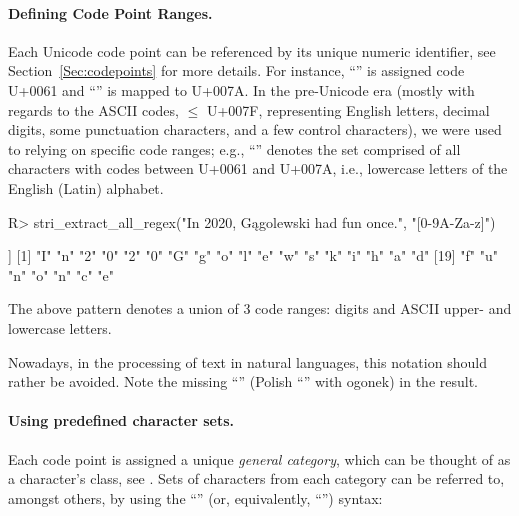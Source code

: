 \documentclass[nojss]{jss}
\begin{document}
\paragraph{Defining Code Point Ranges.}
Each Unicode code point can be referenced by its unique numeric identifier,
see Section~\ref{Sec:codepoints}  for more details.
For instance, ``'' is assigned code U+0061 and ``'' is mapped to U+007A.
In the pre-Unicode era (mostly with regards to the ASCII codes, $\le$ U+007F,
representing English letters, decimal digits, some punctuation characters,
and a few control characters),
we were used to relying on specific code ranges; e.g.,
``\code{[a-z]}'' denotes the set comprised of all
characters with codes between U+0061 and U+007A, i.e., lowercase letters
of the English (Latin) alphabet.

\begin{Schunk}
\begin{Sinput}
R> stri_extract_all_regex("In 2020, Gągolewski had fun once.", "[0-9A-Za-z]")
\end{Sinput}
\begin{Soutput}
[[1]]
 [1] "I" "n" "2" "0" "2" "0" "G" "g" "o" "l" "e" "w" "s" "k" "i" "h" "a" "d"
[19] "f" "u" "n" "o" "n" "c" "e"
\end{Soutput}
\end{Schunk}



The above pattern denotes a union of 3 code ranges:
digits and ASCII upper- and lowercase letters.

Nowadays, in the processing of text in natural languages, this
notation should rather be avoided. Note the missing ``''
(Polish ``'' with ogonek) in the result.


\paragraph{Using predefined character sets.}
Each code point is assigned a unique \textit{general category},
which can be thought of as a character's class,
see \citep{usa44:ucd}.
Sets of characters from each category can be referred to,
amongst others, by using the ``''
(or, equivalently, ``'') syntax:
\end{document}
